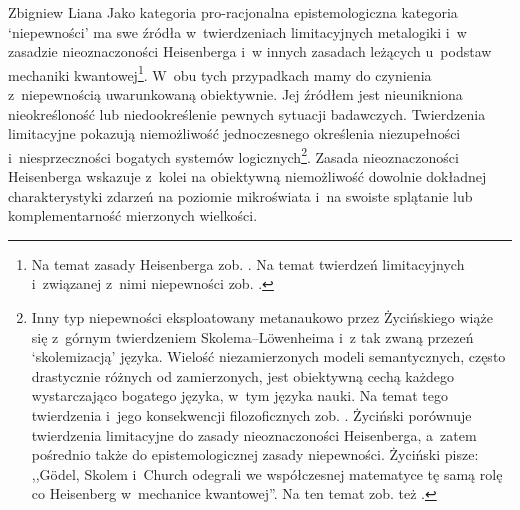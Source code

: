 \begin{artplenv}{Zbigniew Liana}
\enlargethispage{-\baselineskip}
Jako kategoria pro-racjonalna epistemologiczna kategoria ‘niepewności' ma swe źródła w~twierdzeniach limitacyjnych metalogiki i~w zasadzie nieoznaczoności Heisenberga i~w innych zasadach leżących u~podstaw mechaniki kwantowej\footnote{Na temat zasady Heisenberga zob.
\parencites[][s.~158n]{zycinski_teizm_1985}[][s.~138nn]{zycinski_structure_1988}[][s.~246n]{zycinski_struktura_2013_liana}. %
 Na temat twierdzeń limitacyjnych i~związanej z~nimi niepewności zob. 
\parencites[][s.~158]{zycinski_teizm_1985}[][s.~18–46]{zycinski_teizm_1988}[][s.~102–113]{zycinski_structure_1988}[][s.~183–201]{zycinski_struktura_2013_liana}[][s.~262–276]{zycinski_elementy_1996}[][s.~355–374]{zycinski_elementy_2015}.
}.
W~obu tych przypadkach mamy do czynienia z~niepewnością uwarunkowaną obiektywnie. Jej źródłem jest nieunikniona nieokreśloność lub niedookreślenie pewnych sytuacji badawczych. Twierdzenia limitacyjne pokazują niemożliwość jednoczesnego określenia niezupełności i~niesprzeczności bogatych systemów logicznych\footnote{Inny typ niepewności eksploatowany metanaukowo przez Życińskiego wiąże się z~górnym twierdzeniem Skolema–Löwenheima i~z tak zwaną przezeń ‘skolemizacją' języka. Wielość niezamierzonych modeli semantycznych, często drastycznie różnych od zamierzonych, jest obiektywną cechą każdego wystarczająco bogatego języka, w~tym języka nauki. Na temat tego twierdzenia i~jego konsekwencji filozoficznych zob.
\parencites[][s.~22–46]{zycinski_structure_1988}[][s.~270–276]{zycinski_elementy_1996}[][s.~369–373]{zycinski_elementy_2015}. %
 Życiński porównuje twierdzenia limitacyjne do zasady nieoznaczoności Heisenberga, a~zatem pośrednio także do epistemologicznej zasady niepewności. Życiński 
\parencites*[][s.~109]{zycinski_structure_1988}[][s.~194]{zycinski_struktura_2013_liana} %
 pisze: ,,Gödel, Skolem i~Church odegrali we współczesnej matematyce tę samą rolę co Heisenberg w~mechanice kwantowej''. Na ten temat zob. też 
\parencites[][s.~273]{zycinski_elementy_1996}[][s.~371]{zycinski_elementy_2015}.%
}. Zasada nieoznaczoności Hei\-senberga wskazuje z~kolei na obiektywną niemożliwość dowolnie dokładnej charakterystyki zdarzeń na poziomie mikroświata i~na swoiste splątanie lub komplementarność mierzonych wielkości.


\end{artplenv}
